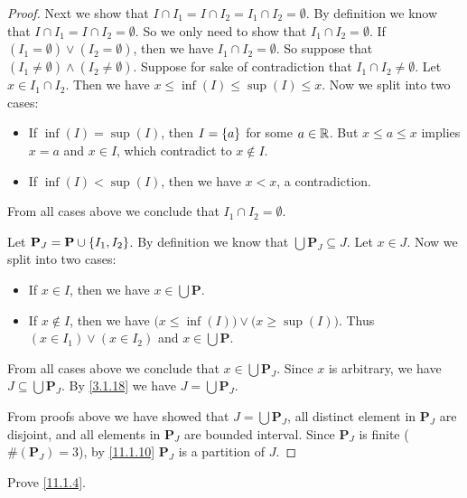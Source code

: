 \begin{proof}
  Next we show that \(I \cap I_1 = I \cap I_2 = I_1 \cap I_2 = \emptyset\).
  By definition we know that \(I \cap I_1 = I \cap I_2 = \emptyset\).
  So we only need to show that \(I_1 \cap I_2 = \emptyset\).
  If \((I_1 = \emptyset) \lor (I_2 = \emptyset)\), then we have \(I_1 \cap I_2 = \emptyset\).
  So suppose that \((I_1 \neq \emptyset) \land (I_2 \neq \emptyset)\).
  Suppose for sake of contradiction that \(I_1 \cap I_2 \neq \emptyset\).
  Let \(x \in I_1 \cap I_2\).
  Then we have \(x \leq \inf(I) \leq \sup(I) \leq x\).
  Now we split into two cases:
  \begin{itemize}
    \item If \(\inf(I) = \sup(I)\), then \(I = \left\lbrace a\right\rbrace\) for some \(a \in \mathbb{R}\).
          But \(x \leq a \leq x\) implies \(x = a\) and \(x \in I\), which contradict to \(x \notin I\).
    \item If \(\inf(I) < \sup(I)\), then we have \(x < x\), a contradiction.
  \end{itemize}
  From all cases above we conclude that \(I_1 \cap I_2 = \emptyset\).

  Let \(\mathbf{P}_J = \mathbf{P} \cup \left\lbrace I_1, I_2\right\rbrace\).
  By definition we know that \(\bigcup \mathbf{P}_J \subseteq J\).
  Let \(x \in J\).
  Now we split into two cases:
  \begin{itemize}
    \item If \(x \in I\), then we have \(x \in \bigcup \mathbf{P}\).
    \item If \(x \notin I\), then we have \(\big(x \leq \inf(I)\big) \lor \big(x \geq \sup(I)\big)\).
          Thus \((x \in I_1) \lor (x \in I_2)\) and \(x \in \bigcup \mathbf{P}\).
  \end{itemize}
  From all cases above we conclude that \(x \in \bigcup \mathbf{P}_J\).
  Since \(x\) is arbitrary, we have \(J \subseteq \bigcup \mathbf{P}_J\).
  By \cref{3.1.18} we have \(J = \bigcup \mathbf{P}_J\).

  From proofs above we have showed that \(J = \bigcup \mathbf{P}_J\), all distinct element in \(\mathbf{P}_J\) are disjoint, and all elements in \(\mathbf{P}_J\) are bounded interval.
  Since \(\mathbf{P}_J\) is finite (\(\#(\mathbf{P}_J) = 3\)), by \cref{11.1.10} \(\mathbf{P}_J\) is a partition of \(J\).
\end{proof}

\exercisesection

\begin{ex}\label{ex:11.1.1}
  Prove \cref{11.1.4}.
\end{ex}

